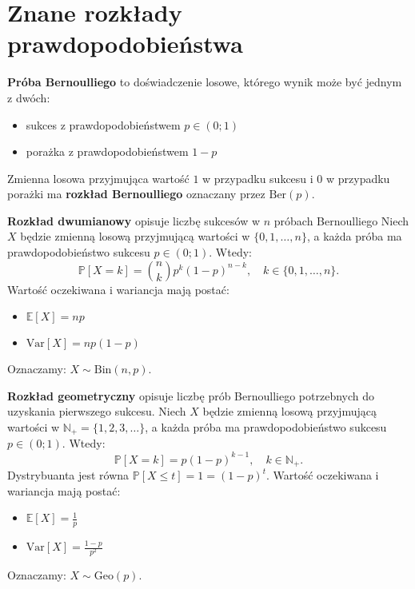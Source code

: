\section{Znane rozkłady prawdopodobieństwa}

\begin{definition}
\textbf{Próba Bernoulliego} to doświadczenie losowe, którego wynik może być jednym z dwóch:
\begin{itemize}
    \item sukces z prawdopodobieństwem  $p \in (0;1)$
    \item porażka z prawdopodobieństwem  $1 - p$
\end{itemize}  

Zmienna losowa przyjmująca wartość $1$ w przypadku sukcesu i $0$ w przypadku porażki ma \textbf{rozkład Bernoulliego} oznaczany przez $\mathrm{Ber}(p)$.
\end{definition}

\begin{definition}
\textbf{Rozkład dwumianowy} opisuje liczbę sukcesów w $n$ próbach Bernoulliego
Niech $X$ będzie zmienną losową przyjmującą wartości w $\{0,1,\dots,n\}$, a każda próba ma prawdopodobieństwo sukcesu $p \in (0;1)$.  
Wtedy:
\[
\mathbb{P}[X = k] = \binom{n}{k}p^k(1-p)^{n-k}, \quad k \in \{0,1,\dots,n\}.
\]
Wartość oczekiwana i wariancja mają postać:
\begin{itemize}
    \item $\mathbb{E}[X] = np$
    \item $\mathrm{Var}[X] = np(1-p)$
\end{itemize} 
Oznaczamy: $X \sim \mathrm{Bin}(n,p)$.
\end{definition}

\begin{definition}
\textbf{Rozkład geometryczny} opisuje liczbę prób Bernoulliego potrzebnych do uzyskania pierwszego sukcesu.  
Niech $X$ będzie zmienną losową przyjmującą wartości w $\mathbb{N}_+ = \{1,2,3,\dots\}$, a każda próba ma prawdopodobieństwo sukcesu $p \in (0;1)$.  
Wtedy:
\[
\mathbb{P}[X = k] = p(1 - p)^{k-1}, \quad k \in \mathbb{N}_+.
\]
Dystrybuanta jest równa $\mathbb{P}[X\le t] = 1 = (1-p)^t$.
Wartość oczekiwana i wariancja mają postać:
\begin{itemize}
    \item $\mathbb{E}[X] = \frac{1}{p}$
    \item $\mathrm{Var}[X] = \frac{1 - p}{p^2}$
\end{itemize}  
Oznaczamy: $X \sim \mathrm{Geo}(p)$.
\end{definition}

